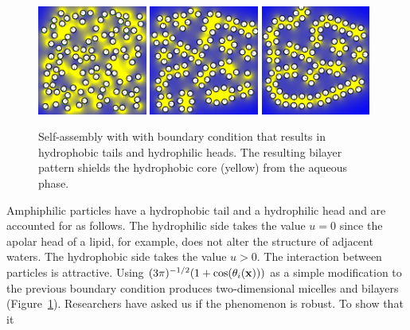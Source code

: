 \begin{figure}[h!]
\begin{center}  
    \includegraphics[width=0.32\textwidth]{figures/SpecificAim1/N100B1.pdf}
    \includegraphics[width=0.32\textwidth]{figures/SpecificAim1/N100B2.pdf}
    \includegraphics[width=0.32\textwidth]{figures/SpecificAim1/N100B3.pdf}
\end{center}    
  \caption{\label{fig:self-assemblyB} Self-assembly with with boundary
  condition that results in hydrophobic tails and hydrophilic heads. The
  resulting bilayer pattern shields the hydrophobic core (yellow) from
  the aqueous phase.}
\end{figure}
Amphiphilic particles have a hydrophobic tail and a hydrophilic head and
are accounted for as follows. The hydrophilic side takes the value $u =
0$ since the apolar head of a lipid, for example, does not alter
the structure of adjacent waters. The hydrophobic side takes the value
$u > 0$. The interaction between particles is attractive. Using $(3\pi
)^{-1/2}(1 + \cos(\theta_i(\mathbf{x})))$ as a simple modification to
the previous boundary condition produces two-dimensional micelles and
bilayers \cite{Fu2018_SIAM} (Figure~\ref{fig:self-assemblyB}).
Researchers have asked us if the phenomenon is robust. To show that it
